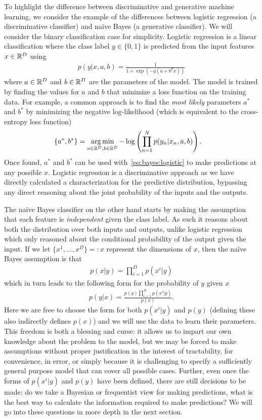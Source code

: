 To highlight the difference between discriminative and generative machine learning, we consider the
example of the differences between logistic regression (a discriminative classifier) and na\"{i}ve Bayes 
(a generative classifier).  We will consider the binary classification case for simplicity.  Logistic regression is a linear
classification where the class label $y \in \{0,1\}$ is predicted from the input features $x \in \mathbb{R}^D$ using
\begin{align}
\label{eq:bayes:logistic}
p(y|x,a,b) = \frac{1}{1+\exp(-y(a+b^Tx))}
\end{align}
where $a \in \mathbb{R}^D$ and $b \in \mathbb{R}^D$ are the parameters of the model.  The model is trained by finding the values
for $a$ and $b$ that minimize a loss function on the training data.  For example, a common approach
is to find the \emph{most likely} parameters $a^*$ and $b^*$ by minimizing the negative log-likelihood
(which is equivalent to the cross-entropy loss function)
\begin{align}
\{a^*,b^*\} &= \operatorname*{arg\,min}_{a\in \mathbb{R}^D,b\in \mathbb{R}^D} -\log \left(\prod_{n=1}^{N} p(y_n|x_n,a,b)\right).
\end{align}
Once found, $a^*$ and $b^*$ can be used with~\eqref{eq:bayes:logistic} to make predictions at
any possible $x$.  Logistic regression is a discriminative approach as we have directly calculated
a characterization for the predictive distribution, bypassing any direct reasoning about the joint
probability of the inputs and the outputs.

The na\"{i}ve Bayes classifier on the other hand starts by making the assumption that each feature
is \emph{independent} given the class label.  As such it reasons about both the distribution over both
inputs and outputs, unlike logistic regression which only reasoned about the conditional probability
of the output given the input.   If we let $\{x^1,\dots,x^D\} =: x$ represent the dimensions of $x$, then
the na\"{i}ve Bayes assumption is that
\begin{align}
p(x|y) = \prod_{i=1}^D p(x^i |y)
\end{align}
which in turn leads to the following form for the probability of $y$ given $x$
\begin{align}
p(y|x) = \frac{p(y) \prod_{i=1}^D p(x^i |y)}{p(x)}.
\end{align}
Here we are free to choose the form for both $p(x^i |y)$ and $p(y)$ (defining these also indirectly defines $p(x)$)
and we will use the data to learn their parameters.
This freedom is both a blessing and curse: it allows us to impart our own knowledge about the problem to
the model, but we may be forced to make assumptions without proper justification in the interest
of tractability, for convenience, in error, or simply because it is challenging to specify a sufficiently
general purpose model that can cover all possible cases.
Further, even once the forms of $p(x^i |y)$ and $p(y)$ have been defined, there are still decisions to be
made: do we take a Bayesian or frequentist view for making predictions, what is the best way
to calculate the information required to make predictions?  We will go into these questions in
more depth in the next section.

